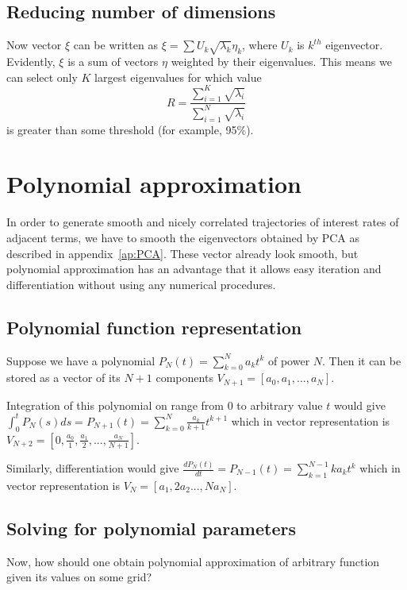 \documentclass[11pt]{article} %
\begin{document}
\subsection{Reducing number of dimensions}
Now vector $\xi$ can be written as  $\xi = \sum{U_k\sqrt{\lambda_k}\eta_k}$, where $U_k$ is $k^{th}$ eigenvector. Evidently, $\xi$ is a sum of vectors $\eta$ weighted by their eigenvalues. This means we can select only $K$ largest eigenvalues for which value
\begin{equation}
R = \frac{\sum_{i=1}^K{\sqrt{\lambda_i}}}{\sum_{i=1}^N{\sqrt{\lambda_i}}}
\end{equation} 
is greater than some threshold (for example, 95\%).

\section{Polynomial approximation}
\label{ap:Polynom}

In order to generate smooth and nicely correlated trajectories of interest rates of adjacent terms, we have to smooth the eigenvectors obtained by PCA as described in appendix~\ref{ap:PCA}. These vector already look smooth, but polynomial approximation has an advantage that it allows easy iteration and differentiation without using any numerical procedures. 
\subsection{Polynomial function representation}
Suppose we have a polynomial $P_N(t) = \sum_{k=0}^N a_k t^k$ of power $N$. Then it can be stored as a vector of its $N+1$ components $V_{N+1} = [a_0, a_1, ..., a_N]$.

Integration of this polynomial on range from $0$ to arbitrary value $t$ would give $\int_0^t{P_N(s)ds} = P_{N+1}(t) = \sum_{k=0}^{N} \frac{a_k}{k+1} t^{k+1}$
which in vector representation is $V_{N+2} = \left[0, \frac{a_0}{1}, \frac{a_1}{2}, ..., \frac{a_N}{N+1}\right]$. 

Similarly, differentiation would give $\frac{dP_N(t)}{dt} = P_{N-1}(t) = \sum_{k=1}^{N-1} ka_k t^k$ which in vector representation is $V_{N} = \left[a_1, 2a_2 ..., Na_N\right]$.

\subsection{Solving for polynomial parameters}
Now, how should one obtain polynomial approximation of arbitrary function given its values on some grid? 
\end{document}
